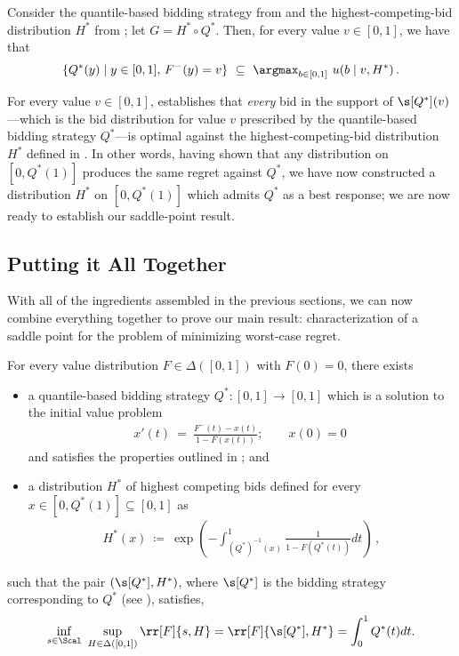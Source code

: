 \begin{lemma}\label{lemma:bid-strat-optimality}
	Consider the quantile-based bidding strategy from  and the highest-competing-bid distribution $H^*$ from ; let $G = H^* \circ Q^*$. Then, for every value $v \in [0,1]$, 
    we have that
	\begin{align*}
		\{Q^*(y) \mid y \in[0,1], \, F^-(y) = v\}\ \subseteq\ \argmax_{b \in [0,1]}\ u(b \mid v, H^*)\,.
	\end{align*} 
\end{lemma}
For every value $v \in [0,1]$,  establishes that \emph{every} bid in the support of $\s[Q^*](v)$---which is the bid distribution for value $v$ prescribed by the quantile-based bidding strategy $Q^*$---is optimal against the highest-competing-bid distribution $H^*$ defined in . In other words, having shown that any distribution on $[0,Q^*(1)]$ produces the same regret against $Q^*$, we have now constructed a distribution $H^*$ on $[0,Q^*(1)]$ which admits $Q^*$ as a best response; we are now ready to establish our saddle-point result.




\subsection{Putting it All Together}\label{sec:main-result}

With all of the ingredients assembled in the previous sections, we can now combine everything together to prove our main result: characterization of a saddle point for the problem of minimizing worst-case regret.

\begin{theorem}\label{thm:main-result}
	 For every value distribution $F \in \Delta([0,1])$ with $F(0) = 0$, there exists
	 \begin{itemize}
	 	\item a quantile-based bidding strategy $Q^*: [0,1] \to [0,1]$ which is a solution to the initial value problem
	 		\begin{align}
	 			x'(t)\ =\ \frac{F^-(t) - x(t)}{1 - F(x(t))}; \qquad x(0) = 0\; \label{eq:ODE_theorem}
	 		\end{align}
	 		and satisfies the properties outlined in ; and
	 	\item a distribution $H^*$ of highest competing bids defined for every $x \in [0,Q^*(1)] \subseteq [0,1]$ as
	 		\begin{align*}
				H^*(x)\ \coloneqq\ \exp\left( - \int_{(Q^*)^{-1}(x)}^1 \frac{1}{1 - F(Q^*(t))} dt \right)\,,
			\end{align*}
	 \end{itemize}
	 such that the pair $(\s[Q^*], H^*)$, where $\s[Q^*]$ is the bidding strategy corresponding to $Q^*$ (see ), satisfies,
     \begin{equation*}
         \inf_{s \in \Scal}\ \sup_{H \in \Delta([0,1])} \rr[F]{s, H} = \rr[F]{\s[Q^*], H^*} = \int_0^1 Q^*(t) dt.
     \end{equation*}
\end{theorem}

